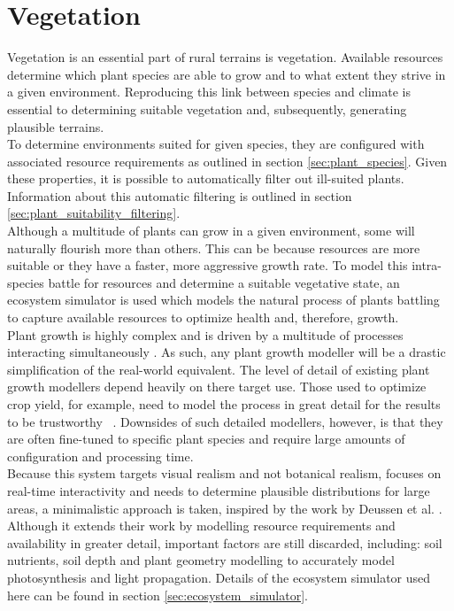 \chapter{Vegetation}

Vegetation is an essential part of rural terrains is vegetation. Available resources determine which plant species are able to grow and to what extent they strive in a given environment. Reproducing this link between species and climate is essential to determining suitable vegetation and, subsequently, generating plausible terrains. \\

To determine environments suited for given species, they are configured with associated resource requirements as outlined in section \ref{sec:plant_species}. Given these properties, it is possible to automatically filter out ill-suited plants. Information about this automatic filtering is outlined in section \ref{sec:plant_suitability_filtering}.\\

Although a multitude of plants can grow in a given environment, some will naturally flourish more than others. This can be because resources are more suitable or they have a faster, more aggressive growth rate. To model this intra-species battle for resources and  determine a suitable vegetative state, an ecosystem simulator is used which models the natural process of plants battling to capture available resources to optimize health and, therefore, growth.\\
Plant growth is highly complex and is driven by a multitude of processes interacting simultaneously \cite{Fourcaud2008}. As such, any plant growth modeller will be a drastic simplification of the real-world equivalent. The level of detail of existing plant growth modellers depend heavily on there target use. Those used to optimize crop yield, for example, need to model the process in great detail for the results to be trustworthy ~\cite{Soler2001,Soler2003,Yan2004}. Downsides of such detailed modellers, however, is that they are often fine-tuned to specific plant species and require large amounts of configuration and processing time.\\
Because this system targets visual realism and not botanical realism, focuses on real-time interactivity and needs to determine plausible distributions for large areas, a minimalistic approach is taken, inspired by the work by Deussen et al. \cite{Deussen1998}. Although it extends their work by modelling resource requirements and availability in greater detail, important factors are still discarded, including: soil nutrients, soil depth and plant geometry modelling to accurately model photosynthesis and light propagation. Details of the ecosystem simulator used here can be found in section \ref{sec:ecosystem_simulator}.\\

